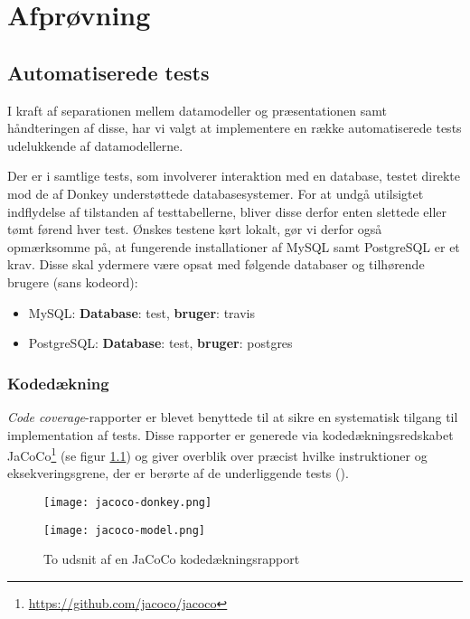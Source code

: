 \chapter{Afprøvning}
\label{chapter:afproevning}

\section{Automatiserede tests}

I kraft af separationen mellem datamodeller og præsentationen samt håndteringen af disse, har vi valgt at implementere en række automatiserede tests udelukkende af datamodellerne.

Der er i samtlige tests, som involverer interaktion med en database, testet direkte mod de af Donkey understøttede databasesystemer. For at undgå utilsigtet indflydelse af tilstanden af testtabellerne, bliver disse derfor enten slettede eller tømt førend hver test. Ønskes testene kørt lokalt, gør vi derfor også opmærksomme på, at fungerende installationer af MySQL samt PostgreSQL er et krav. Disse skal ydermere være opsat med følgende databaser og tilhørende brugere (sans kodeord):

\begin{itemize}
  \item MySQL: \textbf{Database}: test, \textbf{bruger}: travis
  \item PostgreSQL: \textbf{Database}: test, \textbf{bruger}: postgres
\end{itemize}

\subsection{Kodedækning}
\label{subsection:kodedeakning}

\textit{Code coverage}-rapporter er blevet benyttede til at sikre en systematisk tilgang til implementation af tests. Disse rapporter er generede via kodedækningsredskabet JaCoCo\footnote{\url{https://github.com/jacoco/jacoco}} (se figur \ref{code-coverage:donkey}) og giver overblik over præcist hvilke instruktioner og eksekveringsgrene, der er berørte af de underliggende tests (\cite{wiki:code-cov}).

\begin{figure}[h]
\begin{minipage}[b]{0.45\linewidth}
  \centering
  \texttt{[image: jacoco-donkey.png]}
\end{minipage}
\hspace{0.5cm}
\begin{minipage}[b]{0.45\linewidth}
  \centering
  \texttt{[image: jacoco-model.png]}
\end{minipage}
\caption{To udsnit af en JaCoCo kodedækningsrapport}
\label{code-coverage:donkey}
\end{figure}

